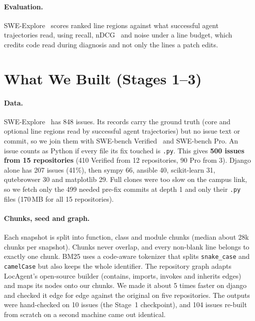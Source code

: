 \documentclass[11pt]{article}
\begin{document}
\paragraph{Evaluation.} SWE-Explore~\citep{zhang2026sweexplore} scores ranked
line regions against what successful agent trajectories read, using
recall, nDCG~\citep{jarvelin2002ndcg} and noise under a line budget, which
credits code read during diagnosis and not only the lines a patch edits.

\section{What We Built (Stages 1--3)}
\label{sec:built}

\paragraph{Data.} SWE-Explore~\citep{zhang2026sweexplore} has 848 issues. Its
records carry the ground truth (core and optional line regions read by
successful agent trajectories) but no issue text or commit, so we join them
with SWE-bench Verified~\citep{jimenez2024swebench, openai2024verified} and
SWE-bench Pro. An issue counts as Python if every file its fix touched is
\texttt{.py}. This gives \textbf{500 issues from 15 repositories} (410
Verified from 12 repositories, 90 Pro from 3). Django alone has 207 issues
(41\%), then sympy 66, ansible 40, scikit-learn 31, qutebrowser 30 and
matplotlib 29. Full clones were too slow on the campus link, so we fetch only
the 499 needed pre-fix commits at depth 1 and only their \texttt{.py} files
(170\,MB for all 15 repositories).

\paragraph{Chunks, seed and graph.} Each snapshot is split into function,
class and module chunks (median about 28k chunks per snapshot). Chunks never
overlap, and every non-blank line belongs to exactly one chunk. BM25 uses a
code-aware tokenizer that splits \texttt{snake\_case} and \texttt{camelCase}
but also keeps the whole identifier. The repository graph adapts LocAgent's
open-source builder (contains, imports, invokes and inherits edges) and maps
its nodes onto our chunks. We made it about 5 times faster on django and
checked it edge for edge against the original on five repositories. The
outputs were hand-checked on 10 issues (the Stage~1 checkpoint), and 104
issues re-built from scratch on a second machine came out identical.
\end{document}
